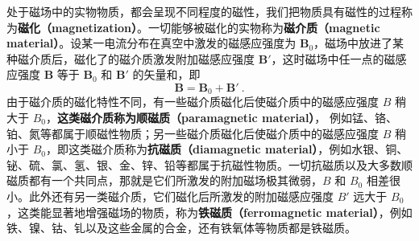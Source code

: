 
处于磁场中的实物物质，都会呈现不同程度的磁性，我们把物质具有磁性的过程称为\textbf{磁化（magnetization）}。一切能够被磁化的实物称为\textbf{磁介质（magnetic material）}。设某一电流分布在真空中激发的磁感应强度为 $\mathbf B_0$，磁场中放进了某种磁介质后，磁化了的磁介质激发附加磁感应强度 $\mathbf B'$，这时磁场中任一点的磁感应强度 $\mathbf B $ 等于 $\mathbf B_0$ 和 $\mathbf B'$ 的矢量和，即
\begin{equation}
\mathbf B=\mathbf B_0+\mathbf B'~.
\end{equation}
由于磁介质的磁化特性不同，有一些磁介质磁化后使磁介质中的磁感应强度 $B$ 稍大于 $B_0$，\textbf{这类磁介质称为顺磁质（paramagnetic material）}， 例如锰、铬、铂、氮等都属于顺磁性物质；另一些磁介质磁化后使磁介质中的磁感应强度 $B$ 稍小于 $B_0$，即这类磁介质称为\textbf{抗磁质（diamagnetic material）}，例如水银、铜、铋、硫、氯、氢、银、金、锌、铅等都属于抗磁性物质。一切抗磁质以及大多数顺磁质都有一个共同点，那就是它们所激发的附加磁场极其微弱，$B$ 和 $B_0$ 相差很小。此外还有另一类磁介质，它们磁化后所激发的附加磁感应强度 $B'$ 远大于 $B_0$，这类能显著地增强磁场的物质，称为\textbf{铁磁质（ferromagnetic material）}，例如铁、镍、钴、钆以及这些金属的合金，还有铁氧体等物质都是铁磁质。
